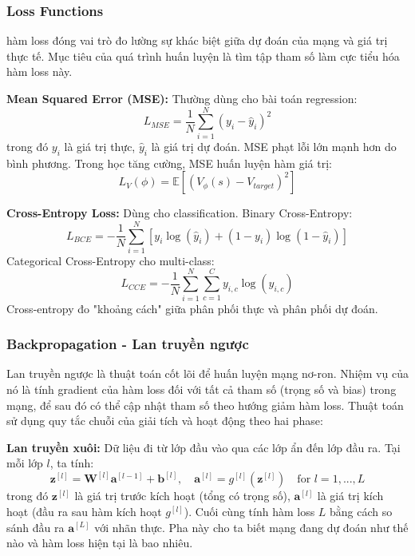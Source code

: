 \subsubsection{Loss Functions}

hàm loss đóng vai trò đo lường sự khác biệt giữa dự đoán của mạng và giá trị thực tế. Mục tiêu của quá trình huấn luyện là tìm tập tham số làm cực tiểu hóa hàm loss này.

\textbf{Mean Squared Error (MSE):} Thường dùng cho bài toán regression:
\begin{equation}
L_{MSE} = \frac{1}{N} \sum_{i=1}^N (y_i - \hat{y}_i)^2
\end{equation}
trong đó $y_i$ là giá trị thực, $\hat{y}_i$ là giá trị dự đoán. MSE phạt lỗi lớn mạnh hơn do bình phương. Trong học tăng cường, MSE huấn luyện hàm giá trị:
\begin{equation}
L_V(\phi) = \mathbb{E}[(V_\phi(s) - V_{target})^2]
\end{equation}

\textbf{Cross-Entropy Loss:} Dùng cho classification. Binary Cross-Entropy:
\begin{equation}
L_{BCE} = -\frac{1}{N} \sum_{i=1}^N [y_i \log(\hat{y}_i) + (1-y_i) \log(1-\hat{y}_i)]
\end{equation}
Categorical Cross-Entropy cho multi-class:
\begin{equation}
L_{CCE} = -\frac{1}{N} \sum_{i=1}^N \sum_{c=1}^C y_{i,c} \log(\hat{y}_{i,c})
\end{equation}
Cross-entropy đo "khoảng cách" giữa phân phối thực và phân phối dự đoán.

\subsubsection{Backpropagation - Lan truyền ngược}

Lan truyền ngược là thuật toán cốt lõi để huấn luyện mạng nơ-ron. Nhiệm vụ của nó là tính gradient của hàm loss đối với tất cả tham số (trọng số và bias) trong mạng, để sau đó có thể cập nhật tham số theo hướng giảm hàm loss. Thuật toán sử dụng quy tắc chuỗi của giải tích và hoạt động theo hai phase:

\textbf{Lan truyền xuôi:} Dữ liệu đi từ lớp đầu vào qua các lớp ẩn đến lớp đầu ra. Tại mỗi lớp $l$, ta tính:
\begin{equation}
\mathbf{z}^{[l]} = \mathbf{W}^{[l]} \mathbf{a}^{[l-1]} + \mathbf{b}^{[l]}, \quad \mathbf{a}^{[l]} = g^{[l]}(\mathbf{z}^{[l]}) \quad \text{for } l=1,...,L
\end{equation}
trong đó $\mathbf{z}^{[l]}$ là giá trị trước kích hoạt (tổng có trọng số), $\mathbf{a}^{[l]}$ là giá trị kích hoạt (đầu ra sau hàm kích hoạt $g^{[l]}$). Cuối cùng tính hàm loss $L$ bằng cách so sánh đầu ra $\mathbf{a}^{[L]}$ với nhãn thực. Pha này cho ta biết mạng đang dự đoán như thế nào và hàm loss hiện tại là bao nhiêu.

